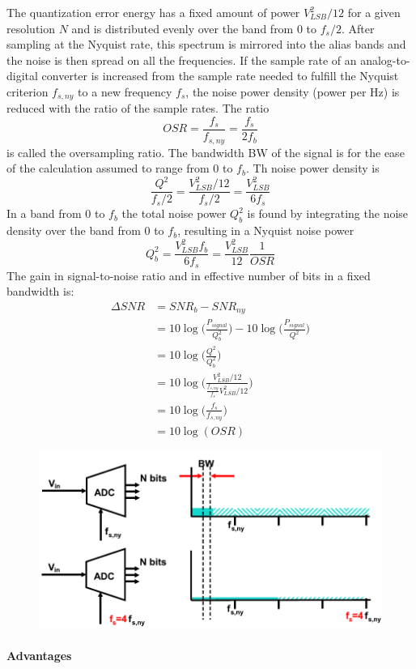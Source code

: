 The quantization error energy has a fixed
amount of power $V^2_{LSB}/12$ for a given resolution $N$ and is distributed evenly over
the band from 0 to $f_s/2$. After sampling at the Nyquist rate, this spectrum is mirrored into the alias bands and the noise is then spread on all the frequencies. If the sample rate of an analog-to-digital converter is increased from the sample
rate needed to fulfill the Nyquist criterion $f_{s,ny}$ to a new frequency $f_s$, the noise
power density (power per Hz) is reduced with the ratio of the sample rates.
The ratio $$OSR = \frac{f_s}{f_{s,ny}} = \frac{f_s}{2f_b}$$ 
is called the oversampling ratio. The bandwidth BW of the signal is for the
ease of the calculation assumed to range from 0 to $f_b$. Th
noise power density is
$$ \frac{Q^2}{f_s/2} = \frac{V_{LSB}^2/12}{f_s/2} = \frac{V_{LSB}^2}{6f_s}$$
In a band from 0 to $f_b$ the total noise power $Q_b^2$ is found by integrating the noise
density over the band from 0 to $f_b$, resulting in a Nyquist noise power
$$ Q^2_b=  \frac{V_{LSB}^2 f_b}{6f_s} = \frac{V_{LSB}^2}{12} \frac{1}{OSR}$$
The gain in signal-to-noise ratio and in effective number of bits in a fixed
bandwidth is:
\begin{align*}
\Delta SNR & = SNR_b - SNR_{ny} \\
           & = 10 \log\Big(\frac{P_{signal}}{Q_b^2}\Big) - 10 \log\Big(\frac{P_{signal}}{Q^2}\Big) \\
           & = 10 \log\Big(\frac{Q^2}{Q_b^2}\Big) \\
           & = 10 \log\Big(\frac{V_{LSB}^2/12}{\frac{f_{s,ny}}{f_s}V_{LSB}^2/12}\Big) \\
           & = 10 \log\Big(\frac{f_s}{f_{s,ny}}\Big) \\
           & = 10 \log(OSR)
\end{align*}

\begin{figure}[H]
    \centering
    \includegraphics[width = 0.5 \textwidth]{L5/img/oversampling.PNG}
\end{figure}

\paragraph{Advantages}

